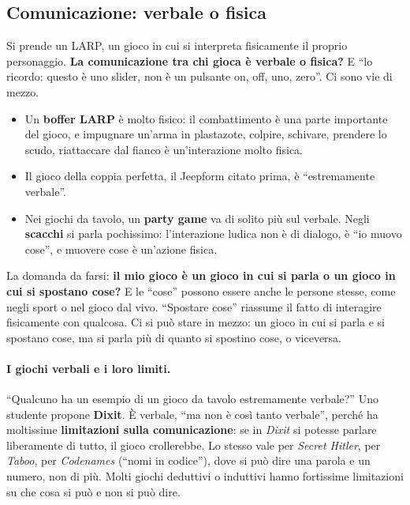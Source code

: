 \subsection{Comunicazione: verbale o fisica}

Si prende un LARP, un gioco in cui si interpreta fisicamente il proprio
personaggio. \textbf{La comunicazione tra chi gioca è verbale o fisica?} E
``lo ricordo: questo è uno slider, non è un pulsante on, off, uno, zero''. Ci
sono vie di mezzo.
\begin{itemize}
  \item Un \textbf{boffer LARP} è molto fisico: il combattimento è una parte
        importante del gioco, e impugnare un'arma in plastazote, colpire,
        schivare, prendere lo scudo, riattaccare dal fianco è un'interazione
        molto fisica.
  \item Il gioco della coppia perfetta, il Jeepform citato prima, è
        ``estremamente verbale''.
  \item Nei giochi da tavolo, un \textbf{party game} va di solito più sul
        verbale. Negli \textbf{scacchi} si parla pochissimo: l'interazione ludica
        non è di dialogo, è ``io muovo cose'', e muovere cose è un'azione fisica.
\end{itemize}
La domanda da farsi: \textbf{il mio gioco è un gioco in cui si parla o un gioco
in cui si spostano cose?} E le ``cose'' possono essere anche le persone stesse,
come negli sport o nel gioco dal vivo. ``Spostare cose'' riassume il fatto di
interagire fisicamente con qualcosa. Ci si può stare in mezzo: un gioco in cui si
parla e si spostano cose, ma si parla più di quanto si spostino cose, o
viceversa.

\paragraph{I giochi verbali e i loro limiti.} ``Qualcuno ha un esempio di un gioco
da tavolo estremamente verbale?'' Uno studente propone \textbf{Dixit}. È
verbale, ``ma non è così tanto verbale'', perché ha moltissime
\textbf{limitazioni sulla comunicazione}: se in \emph{Dixit} si potesse parlare
liberamente di tutto, il gioco crollerebbe. Lo stesso vale per \emph{Secret
Hitler}, per \emph{Taboo}, per \emph{Codenames} (``nomi in codice''), dove si può
dire una parola e un numero, non di più. Molti giochi deduttivi o induttivi hanno
fortissime limitazioni su che cosa si può e non si può dire.

